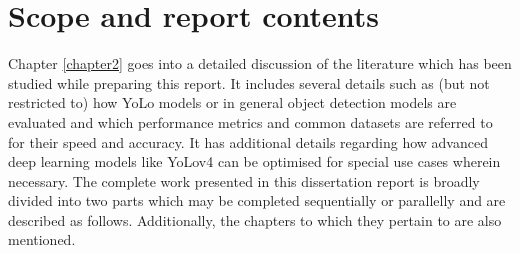 \section{Scope and report contents}

Chapter \ref{chapter2} goes into a detailed discussion of the literature which has been studied while preparing this report. It includes several details such as (but not restricted to) how YoLo models or in general object detection models are evaluated and which performance metrics and common datasets are referred to for their speed and accuracy. It has additional details regarding how advanced deep learning models like YoLov4 can be optimised for special use cases wherein necessary.
The complete work presented in this dissertation report is broadly divided into two parts which may be completed sequentially or parallelly and are described as follows. Additionally, the chapters to which they pertain to are also mentioned.

